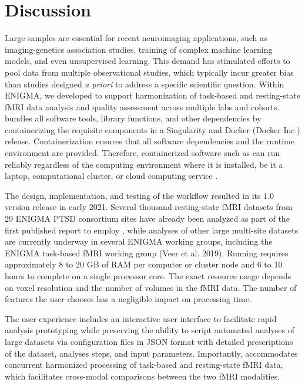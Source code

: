 \section{Discussion}

Large samples are essential for recent neuroimaging applications, such as
imaging-genetics association studies, training of complex machine learning
models, and even unsupervised learning. This demand has stimulated efforts
to pool data from multiple observational studies, which typically incur
greater bias than studies designed \emph{a priori} to address a specific
scientific question. Within ENIGMA, we developed  to support
harmonization of task-based and resting-state fMRI data analysis and
quality assessment across multiple labs and cohorts. 
bundles all software tools, library functions, and other dependencies by
containerizing the requisite components in a Singularity
\citep{10.1371/journal.pone.0177459} and Docker (Docker Inc.) release.
Containerization ensures that all software dependencies and the runtime
environment are provided. Therefore, containerized software such as
 can run reliably regardless of the computing environment
where it is installed, be it a laptop, computational cluster, or cloud
computing service \citep{10.1016/j.cels.2018.03.014}.

The design, implementation, and testing of the  workflow
resulted in its 1.0 version release in early 2021. Several thousand
resting-state fMRI datasets from 29 ENIGMA PTSD consortium sites have
already been analyzed as part of the first published report to employ
 \citep{weis_thesis}, while analyses of other large
multi-site datasets are currently underway in several ENIGMA working
groups, including the ENIGMA task-based fMRI working group (Veer et al.
2019). Running  requires approximately 8 to 20 GB of RAM per
computer or cluster node and 6 to 10 hours to complete on a single
processor core. The exact resource usage depends on voxel resolution and
the number of volumes in the fMRI data. The number of features the user
chooses has a negligible impact on processing time.

The  user experience includes an interactive user interface
to facilitate rapid analysis prototyping while preserving the ability to
script automated analyses of large datasets via configuration files in JSON
format with detailed prescriptions of the dataset, analyses steps, and
input parameters. Importantly,  accommodates concurrent
harmonized processing of task-based and resting-state fMRI data, which
facilitates cross-modal comparisons between the two fMRI modalities.

